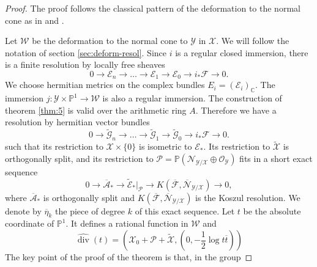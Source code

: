 \documentclass[10pt,twoside]{article}
\numberwithin{equation}{section}
\theoremstyle{plain}
\theoremstyle{definition}
\DeclareMathOperator{\dv}{div}
\begin{document}
\begin{proof}
  The proof follows the classical pattern of the deformation to the
  normal cone as in \cite{BismutGilletSoule:MR1086887} and
  \cite{zha99:_rieman_roch}. 

  Let $\mathcal{W}$ be the deformation to the normal cone to
  $\mathcal{Y}$ in $\mathcal{X}$. We will follow the notation of
  section \ref{sec:deform-resol}. Since $i$ is a regular closed
  immersion, there is a finite resolution by locally free sheaves
  \begin{displaymath}
    0\to
    \mathcal{E}_{n}\to \dots \to \mathcal{E}_{1}\to \mathcal{E}_{0}
    \to i_{\ast}\mathcal{F}\to 0. 
  \end{displaymath}
  We choose hermitian metrics on the complex bundles
  $E_{i}=(\mathcal{E}_{i})_{\mathbb{C}}$. The immersion
  $j\colon \mathcal{Y}\times \mathbb{P}^{1}\longrightarrow \mathcal{W}$ is
  also a regular immersion. The construction of theorem 
  \ref{thm:5} is valid over the arithmetic ring $A$. Therefore we have
  a resolution by hermitian vector bundles
  \begin{displaymath}
    0\to
    \widetilde {\mathcal{G}}_{n}\to \dots \to \widetilde
    {\mathcal{G}}_{1}\to \widetilde{\mathcal{G}}_{0} 
    \to i_{\ast}\mathcal{F}\to 0.
  \end{displaymath}
  such that its restriction to $\mathcal{X}\times \{0\}$ is isometric
  to 
  $\mathcal{E}_{\ast}$. Its restriction to $\widetilde {\mathcal{X}}$
  is orthogonally split, and its restriction to
  $\mathcal{P}=\mathbb{P}(\mathcal{N}_{\mathcal{Y}/\mathcal{X}}\oplus
  \mathcal{O}_{\mathcal{Y}})$ fits in a short exact sequence
  \begin{displaymath}
    0\longrightarrow \overline{\mathcal{A}}_{\ast}\longrightarrow 
    \widetilde {\mathcal{E}}_{\ast}|_{\mathcal{P}}\longrightarrow 
    K(\overline{\mathcal{F}},
    \overline{\mathcal{N}}_{\mathcal{Y}/\mathcal{X}})\longrightarrow   
    0, 
  \end{displaymath}
  where $\overline{\mathcal{A}}_{\ast}$ is orthogonally split and
  $K(\overline{\mathcal{F}},
  \overline{\mathcal{N}}_{\mathcal{Y}/\mathcal{X}})$ is the Koszul 
  resolution. We denote by $\overline {\eta}_{k}$ the piece of degree
  $k$ of this exact sequence. Let $t$ be the absolute coordinate of
  $\mathbb{P}^{1}$. It defines a rational function in $\mathcal{W}$
  and
  $$\widehat {\dv}(t)=(\mathcal{X}_{0}+\mathcal{P}+\widetilde
  {\mathcal{X}},(0,-\frac{1}{2}\log t\overline t))
  $$ 
  The key point of the proof of the theorem is that, in the group

\end{proof}
\end{document}
